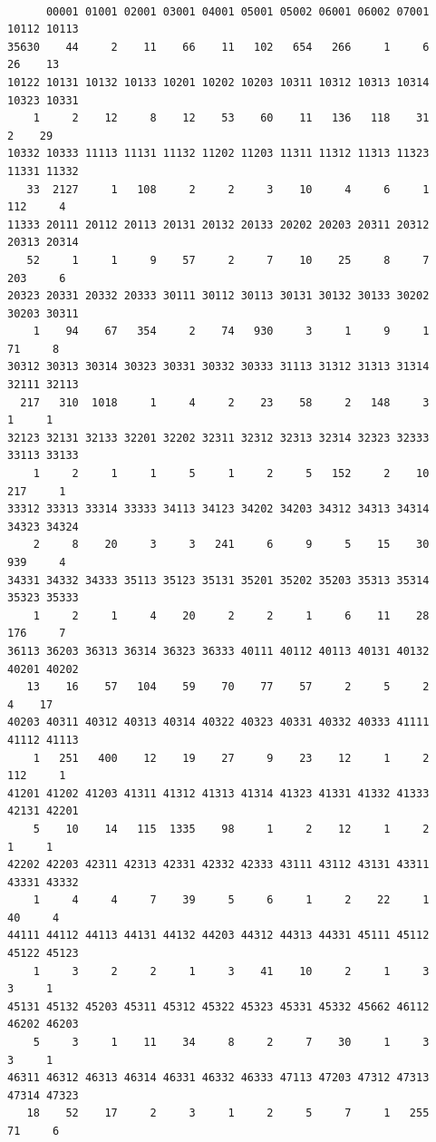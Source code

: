 \documentclass[
]{article}
\begin{document}
\begin{verbatim}

      00001 01001 02001 03001 04001 05001 05002 06001 06002 07001 10112 10113 
35630    44     2    11    66    11   102   654   266     1     6    26    13 
10122 10131 10132 10133 10201 10202 10203 10311 10312 10313 10314 10323 10331 
    1     2    12     8    12    53    60    11   136   118    31     2    29 
10332 10333 11113 11131 11132 11202 11203 11311 11312 11313 11323 11331 11332 
   33  2127     1   108     2     2     3    10     4     6     1   112     4 
11333 20111 20112 20113 20131 20132 20133 20202 20203 20311 20312 20313 20314 
   52     1     1     9    57     2     7    10    25     8     7   203     6 
20323 20331 20332 20333 30111 30112 30113 30131 30132 30133 30202 30203 30311 
    1    94    67   354     2    74   930     3     1     9     1    71     8 
30312 30313 30314 30323 30331 30332 30333 31113 31312 31313 31314 32111 32113 
  217   310  1018     1     4     2    23    58     2   148     3     1     1 
32123 32131 32133 32201 32202 32311 32312 32313 32314 32323 32333 33113 33133 
    1     2     1     1     5     1     2     5   152     2    10   217     1 
33312 33313 33314 33333 34113 34123 34202 34203 34312 34313 34314 34323 34324 
    2     8    20     3     3   241     6     9     5    15    30   939     4 
34331 34332 34333 35113 35123 35131 35201 35202 35203 35313 35314 35323 35333 
    1     2     1     4    20     2     2     1     6    11    28   176     7 
36113 36203 36313 36314 36323 36333 40111 40112 40113 40131 40132 40201 40202 
   13    16    57   104    59    70    77    57     2     5     2     4    17 
40203 40311 40312 40313 40314 40322 40323 40331 40332 40333 41111 41112 41113 
    1   251   400    12    19    27     9    23    12     1     2   112     1 
41201 41202 41203 41311 41312 41313 41314 41323 41331 41332 41333 42131 42201 
    5    10    14   115  1335    98     1     2    12     1     2     1     1 
42202 42203 42311 42313 42331 42332 42333 43111 43112 43131 43311 43331 43332 
    1     4     4     7    39     5     6     1     2    22     1    40     4 
44111 44112 44113 44131 44132 44203 44312 44313 44331 45111 45112 45122 45123 
    1     3     2     2     1     3    41    10     2     1     3     3     1 
45131 45132 45203 45311 45312 45322 45323 45331 45332 45662 46112 46202 46203 
    5     3     1    11    34     8     2     7    30     1     3     3     1 
46311 46312 46313 46314 46331 46332 46333 47113 47203 47312 47313 47314 47323 
   18    52    17     2     3     1     2     5     7     1   255    71     6 

\end{verbatim}
\end{document}
